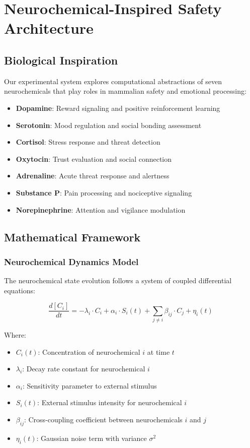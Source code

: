 \documentclass[12pt]{article}
\begin{document}
\section{Neurochemical-Inspired Safety Architecture}

\subsection{Biological Inspiration}

Our experimental system explores computational abstractions of seven neurochemicals that play roles in mammalian safety and emotional processing:

\begin{itemize}
\item \textbf{Dopamine}: Reward signaling and positive reinforcement learning
\item \textbf{Serotonin}: Mood regulation and social bonding assessment
\item \textbf{Cortisol}: Stress response and threat detection
\item \textbf{Oxytocin}: Trust evaluation and social connection
\item \textbf{Adrenaline}: Acute threat response and alertness
\item \textbf{Substance P}: Pain processing and nociceptive signaling
\item \textbf{Norepinephrine}: Attention and vigilance modulation
\end{itemize}

\subsection{Mathematical Framework}

\subsubsection{Neurochemical Dynamics Model}

The neurochemical state evolution follows a system of coupled differential equations:

\begin{equation}
\frac{d[C_i]}{dt} = -\lambda_i \cdot C_i + \alpha_i \cdot S_i(t) + \sum_{j \neq i} \beta_{ij} \cdot C_j + \eta_i(t)
\end{equation}

Where:
\begin{itemize}
\item $C_i(t)$: Concentration of neurochemical $i$ at time $t$
\item $\lambda_i$: Decay rate constant for neurochemical $i$
\item $\alpha_i$: Sensitivity parameter to external stimulus
\item $S_i(t)$: External stimulus intensity for neurochemical $i$
\item $\beta_{ij}$: Cross-coupling coefficient between neurochemicals $i$ and $j$
\item $\eta_i(t)$: Gaussian noise term with variance $\sigma^2$
\end{itemize}
\end{document}
